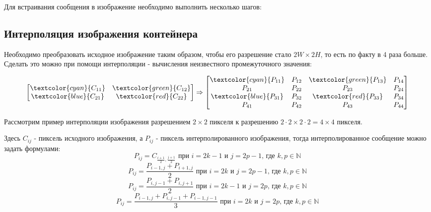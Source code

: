 \documentclass[a4paper]{article}
\begin{document}
  Для встраивания сообщения в изображение необходимо выполнить несколько шагов:
  
  \subsection{Интерполяция изображения контейнера}

  Необходимо преобразовать исходное изображение таким образом, чтобы его разрешение
  стало $2W\times{2H}$, то есть по факту в 4 раза больше. Сделать это можно при помощи интерполяции -
  вычисления неизвестного промежуточного значения:

  \begin{equation}
    \begin{bmatrix}
        \textcolor{cyan}{C_{11}} & \textcolor{green}{C_{12}} \\
        \textcolor{blue}{C_{21}} & \textcolor{red}{C_{22}} 
    \end{bmatrix} \Rightarrow
    \begin{bmatrix}
        \textcolor{cyan}{P_{11}} & P_{12} & \textcolor{green}{P_{13}} & P_{14} \\
        P_{21} & P_{22} & P_{23} & P_{24} \\
        \textcolor{blue}{P_{31}} & P_{32} & \textcolor{red}{P_{33}} & P_{34} \\
        P_{41} & P_{42} & P_{43} & P_{44} 
    \end{bmatrix}
  \end{equation}

  Рассмотрим пример интерполяции изображения разрешением $2\times{2}$ пикселя к
  разрешению $2\cdot 2\times{2\cdot{2}} = 4\times{4}$ пикселя.

  Здесь $C_{ij}$ - пиксель исходного изображения, а $P_{ij}$ - пиксель интерполированного
  изображения, тогда интерполированное сообщение можно задать формулами:
  \begin{equation}
    P_{ij} = C_{\frac{i + 1}{2}, \frac{j + 1}{2}} \text{ при } i = 2k - 1 \text{ и } j = 2p - 1 \text{, где } k,p \in \mathbb{N}
  \end{equation}
  \begin{equation}
    P_{ij} = \frac{P_{i - 1, j} + P_{i + 1, j}}{2} \text{ при } i = 2k \text{ и } j = 2p - 1 \text{, где } k,p \in \mathbb{N}
  \end{equation}
  \begin{equation}
    P_{ij} = \frac{P_{i, j - 1} + P_{i, j + 1}}{2} \text{ при } i = 2k - 1\text{ и } j = 2p \text{, где } k,p \in \mathbb{N}
  \end{equation}
  \begin{equation}
    P_{ij} = \frac{P_{i - 1, j} + P_{i, j - 1} + P_{i - 1, j - 1}}{3} \text{ при } i = 2k \text{ и } j = 2p \text{, где } k,p \in \mathbb{N}
  \end{equation}
\end{document}
